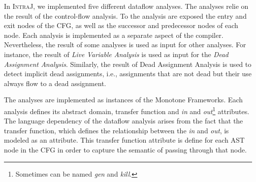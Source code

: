 In \textsc{IntraJ}, we implemented five different dataflow analyses. The analyses 
relie on the result of the control-flow analysis. To the analysis are exposed 
the entry and exit nodes of the CFG, as well as the successor and predecessor
nodes of each node. 
Each analysis is implemented as a separate aspect of the compiler. Nevertheless,
the result of some analyses is used as input for other analyses. For instance,
the result of \emph{Live Variable Analysis} is used as input for the \emph{Dead Assignment Analysis}.
Similarly, the result of Dead Assignment Analysis is used to detect implicit dead assignments, i.e.,
assignments that are not dead but their use always flow to a dead assignment.

The analyses are implemented as instances of the Monotone Frameworks.
Each analysis defines its abstract domain, transfer function and \emph{in} and 
\emph{out}\footnote{Sometimes can be named \emph{gen} and \emph{kill}.} attributes.
The language dependency of the dataflow analysis arises from the fact that the
transfer function, which defines the relationship between the \emph{in} and \emph{out},
is modeled as an attribute. This transfer function attribute is 
define for each AST node in the CFG in order to capture the semantic of passing 
through that node.



















